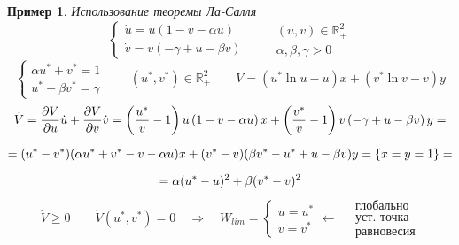 \documentclass[oneside, final, 12pt]{article}
\theoremstyle{def}
\newtheorem{example}{Пример}[section]
\theoremstyle{th}
\theoremstyle{rem}
\numberwithin{figure}{section}
\numberwithin{equation}{section}
\begin{document}
	
	\begin{example}Использование теоремы Ла-Салля
		$$			
			\begin{cases}
				\dot{u} = u(1- v -\alpha u) \\
				\dot{v} = v(-\gamma + u -\beta v) 
			\end{cases} \qquad \begin{gathered} (u,v) \in \mathbb{R}^2_+ \\ \alpha, \beta, \gamma > 0\end{gathered}
		$$
		$$
			\begin{cases}
				 \alpha u^* + v^* =1 \\
				 u^* - \beta v^* = \gamma 
			\end{cases} \qquad  (u^*,v^*) \in \mathbb{R}^2_+ \qquad V = (u^*\ln u- u )x + (v^*\ln v - v) y
		$$
		$$
			\begin{gathered}
				\dot{V} = \dfrac{\partial V}{\partial u} \dot{u} + \dfrac{\partial V}{\partial v} \dot{v} = 
					\left( \dfrac{u^*}{v} -1 \right) u \left(1-v-\alpha u\right)x + 
					\left( \dfrac{v^*}{v} -1 \right) v \left(-\gamma+u-\beta v \right)y = \vspace{2mm} \\
					= (u^* -v^*)(\alpha u^* + v^* -v -\alpha u)x + (v^*-v)(\beta v^* - u^* +u-\beta v)y =
																															 \{x=y=1\} =  \vspace{2mm} \\
					= \alpha(u^*-u)^2+ \beta(v^*-v)^2
			\end{gathered}
		$$	
		$$
			\dot{V} \geqslant 0 \qquad \dot{V}(u^*,v^*) = 0 \quad \Rightarrow \quad W_{lim} = 
						\begin{cases}
							u =u^* \\
							v = v^*
						\end{cases} \leftarrow \quad \begin{gathered} \text{глобально} \\
																					 	\text{уст. точка} \\
																						  \text{равновесия}	 
															\end{gathered}
 		$$
	\end{example}
	
\end{document}
